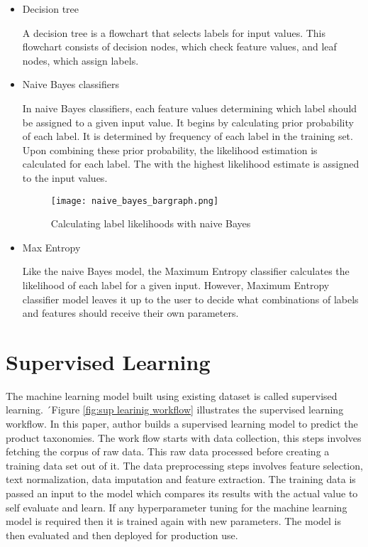 \begin{itemize}
    \item Decision  tree
    
    A decision tree is a flowchart that selects labels for input values. This flowchart consists of decision nodes, which check feature values, and leaf nodes, which assign labels. 

    \item Naive Bayes classifiers
    
    In naive Bayes classifiers, each feature values determining which label should be assigned to a given input value. It begins by calculating prior probability of each label. It is determined by frequency of each label in the training set. Upon combining these prior probability, the likelihood estimation is calculated for each label. The with the highest likelihood estimate is assigned to the input values.


    \begin{figure}[H]
        \centering    
        \texttt{[image: naive\_bayes\_bargraph.png]}
        \caption{Calculating label likelihoods with naive Bayes \parencite{BirdKleinLoper09}}
        \label{fig:Calculating label likelihoods with naive Bayes}
    \end{figure}

    \item Max Entropy
    
    Like the naive Bayes model, the Maximum Entropy classifier calculates the likelihood of each label for a given input.
    However, Maximum Entropy classifier model leaves it up to the user to decide what combinations of labels and features should receive their own parameters.

\end{itemize}

\clearpage

\section{Supervised Learning}

The machine learning model built using existing dataset is called supervised learning. ´Figure \ref{fig:sup learinig workflow} illustrates the supervised learning workflow. In this paper, author builds a supervised learning model to predict the product taxonomies. The work flow starts with data collection, this steps involves fetching the corpus of raw data. This raw data processed before creating a training data set out of it. The data preprocessing steps involves feature selection, text normalization, data imputation and feature extraction. The training data is passed an input to the model which compares its results with the actual value to self evaluate and learn. If any hyperparameter tuning for the machine learning model is required then it is trained again with new parameters. The model is then evaluated and then deployed for production use.

